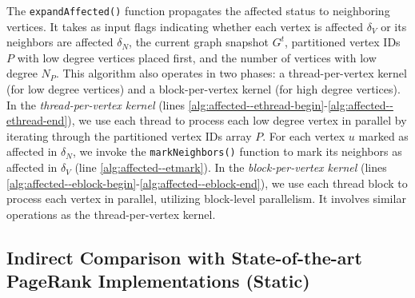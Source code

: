 The \texttt{expandAffected()} function propagates the affected status to neighboring vertices. It takes as input flags indicating whether each vertex is affected $\delta_V$ or its neighbors are affected $\delta_N$, the current graph snapshot $G^t$, partitioned vertex IDs $P$ with low degree vertices placed first, and the number of vertices with low degree $N_P$. This algorithm also operates in two phases: a thread-per-vertex kernel (for low degree vertices) and a block-per-vertex kernel (for high degree vertices). In the \textit{thread-per-vertex kernel} (lines \ref{alg:affected--ethread-begin}-\ref{alg:affected--ethread-end}), we use each thread to process each low degree vertex in parallel by iterating through the partitioned vertex IDs array $P$. For each vertex $u$ marked as affected in $\delta_N$, we invoke the \texttt{markNeighbors()} function to mark its neighbors as affected in $\delta_V$ (line \ref{alg:affected--etmark}). In the \textit{block-per-vertex kernel} (lines \ref{alg:affected--eblock-begin}-\ref{alg:affected--eblock-end}), we use each thread block to process each vertex in parallel, utilizing block-level parallelism. It involves similar operations as the thread-per-vertex kernel.






\subsection{Indirect Comparison with State-of-the-art PageRank Implementations (Static)}
\label{sec:static-comparison-indirect}

